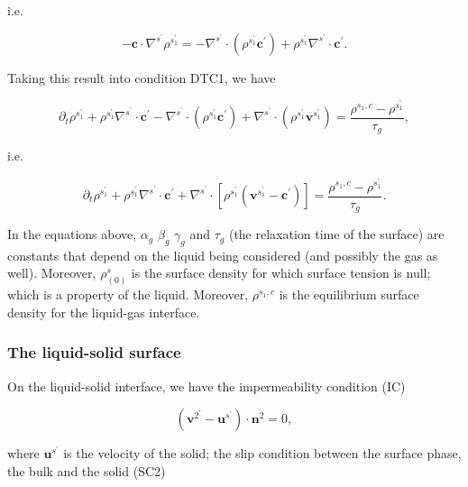 \documentclass{article}
\begin{document}
i.e.

\begin{equation}
-\pmb {c}\cdot \nabla^{s^{\prime}}\rho^{s_{1}^{\prime}} = -\nabla^{s^{\prime}}\cdot (\rho^{s_{1}^{\prime}}\pmb {c}^{\prime}) + \rho^{s_{1}^{\prime}}\nabla^{s^{\prime}}\cdot \pmb {c}^{\prime}. \tag{2.17}
\end{equation}

Taking this result into condition DTC1, we have

\begin{equation}
\partial_{t}\rho^{s_{1}^{\prime}} + \rho^{s_{1}^{\prime}}\nabla^{s^{\prime}}\cdot \pmb {c}^{\prime} - \nabla^{s^{\prime}}\cdot (\rho^{s_{1}^{\prime}}\pmb {c}^{\prime}) + \nabla^{s^{\prime}}\cdot (\rho^{s_{1}^{\prime}}\pmb{v}^{s_{1}^{\prime}}) = \frac{\rho^{s_{1},c} - \rho^{s_{1}^{\prime}}}{\tau_{g}}, \tag{2.18}
\end{equation}

i.e.

\begin{equation}
\partial_{t}\rho^{s_{1}^{\prime}} + \rho^{s_{1}^{\prime}}\nabla^{s^{\prime}}\cdot \pmb {c}^{\prime} + \nabla^{s^{\prime}}\cdot [\rho^{s_{1}^{\prime}}(\pmb{v}^{s_{1}^{\prime}} - \pmb {c}^{\prime})] = \frac{\rho^{s_{1},c} - \rho^{s_{1}^{\prime}}}{\tau_{g}}. \tag{2.19}
\end{equation}

In the equations above, \(\alpha_{g}\) \(\beta_{g}\) \(\gamma_{g}\) and \(\tau_{g}\) (the relaxation time of the surface) are constants that depend on the liquid being considered (and possibly the gas as well). Moreover, \(\rho_{(0)}^{s}\) is the surface density for which surface tension is null; which is a property of the liquid. Moreover, \(\rho^{s_{1},c}\) is the equilibrium surface density for the liquid-gas interface.

\subsubsection{The liquid-solid surface}

On the liquid-solid interface, we have the impermeability condition (IC)

\begin{equation}
(\pmb{v}^{2^{\prime}} - \pmb{u}^{s^{\prime}})\cdot \pmb{n}^{2} = 0, \tag{2.20}
\end{equation}

where \(\pmb{u}^{s^{\prime}}\) is the velocity of the solid; the slip condition between the surface phase, the bulk and the solid (SC2)
\end{document}
